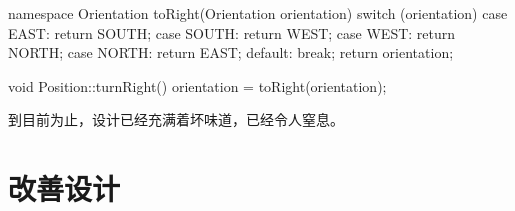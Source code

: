 \begin{content}
\begin{leftbar}
\begin{c++}[caption={src/robot-cleaner/Position.cpp}]
namespace
{
    Orientation toRight(Orientation orientation)
    {
        switch (orientation)
        {
        case EAST:  return SOUTH;
        case SOUTH: return WEST;
        case WEST:  return NORTH;
        case NORTH: return EAST;
        default: break;
        }
        return orientation;
    }
}

void Position::turnRight()
{
    orientation = toRight(orientation);
}
\end{c++}
\end{leftbar}

到目前为止，设计已经充满着坏味道，已经令人窒息。

\begin{enum}
\end{enum}

\end{content}

\section{改善设计}

